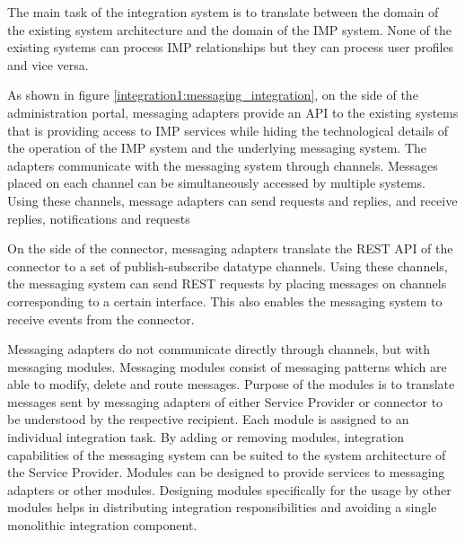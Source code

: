 The main task of the integration system is to translate between the domain of the existing system architecture and the domain of the IMP system. None of the existing systems can process IMP relationships but they can process user profiles and vice versa. 

As shown in figure \ref{integration1:messaging_integration}, on the side of the administration portal, messaging adapters provide an API to the existing systems that is providing access to IMP services while hiding the technological details of the operation of the IMP system and the underlying messaging system. The adapters communicate with the messaging system through channels. Messages placed on each channel can be simultaneously accessed by multiple systems. Using these channels, message adapters can send requests and replies, and receive replies, notifications and requests

On the side of the connector, messaging adapters translate the REST API of the connector to a set of publish-subscribe datatype channels. Using these channels, the messaging system can send REST requests by placing messages on channels corresponding to a certain interface. This also enables the messaging system to receive events from the connector.

Messaging adapters do not communicate directly through channels, but with messaging modules. Messaging modules consist of messaging patterns which are able to modify, delete and route messages. Purpose of the modules is to translate messages sent by messaging adapters of either Service Provider or connector to be understood by the respective recipient. Each module is assigned to an individual integration task. By adding or removing modules, integration capabilities of the messaging system can be suited to the system architecture of the Service Provider. Modules can be designed to provide services to messaging adapters or other modules. Designing modules specifically for the usage by other modules helps in distributing integration responsibilities and avoiding a single monolithic integration component.

